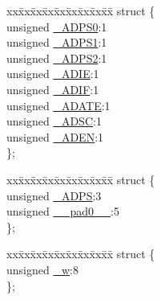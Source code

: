 \begin{DoxyCompactItemize}
\item 
\begin{tabbing}
xx\=xx\=xx\=xx\=xx\=xx\=xx\=xx\=xx\=\kill
struct \{\\
\>unsigned \hyperlink{union_____a_d_c_s_r_abits__t_af002c3eb465d5ebddf7426d88415b337}{\_ADPS0}:1\\
\>unsigned \hyperlink{union_____a_d_c_s_r_abits__t_ae88bed24bdf423d3022b96f0acc5b6a3}{\_ADPS1}:1\\
\>unsigned \hyperlink{union_____a_d_c_s_r_abits__t_a231dd7847c93fde90b90001b7b848f59}{\_ADPS2}:1\\
\>unsigned \hyperlink{union_____a_d_c_s_r_abits__t_a4dddc0cc11f9d46ab69387c46b086645}{\_ADIE}:1\\
\>unsigned \hyperlink{union_____a_d_c_s_r_abits__t_ac37ae330934125ef4611751e7afb323e}{\_ADIF}:1\\
\>unsigned \hyperlink{union_____a_d_c_s_r_abits__t_a7d65a784992e54d7eb71421f3998ef05}{\_ADATE}:1\\
\>unsigned \hyperlink{union_____a_d_c_s_r_abits__t_a3f0b0412d6883e292fa656a8383cdf67}{\_ADSC}:1\\
\>unsigned \hyperlink{union_____a_d_c_s_r_abits__t_a624900a5c9c7dc231ef529da387913ee}{\_ADEN}:1\\
\}; \\

\end{tabbing}\item 
\begin{tabbing}
xx\=xx\=xx\=xx\=xx\=xx\=xx\=xx\=xx\=\kill
struct \{\\
\>unsigned \hyperlink{union_____a_d_c_s_r_abits__t_af162b76508656386855c4ebe12031764}{\_ADPS}:3\\
\>unsigned \hyperlink{union_____a_d_c_s_r_abits__t_ac73c6f5b63ad17d412a00015f0393957}{\_\_pad0\_\_}:5\\
\}; \\

\end{tabbing}\item 
\begin{tabbing}
xx\=xx\=xx\=xx\=xx\=xx\=xx\=xx\=xx\=\kill
struct \{\\
\>unsigned \hyperlink{union_____a_d_c_s_r_abits__t_a1faa31f14f0aec54979ff3a9ff145cc4}{\_w}:8\\
\}; \\

\end{tabbing}\end{DoxyCompactItemize}


